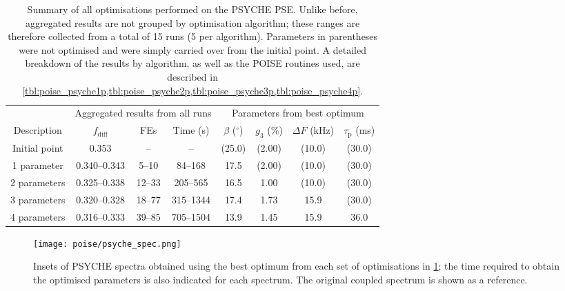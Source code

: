 \begin{table}
    \centering
    \begin{tabular}{cccccccc}
        \toprule
         & \multicolumn{3}{c}{Aggregated results from all runs} & \multicolumn{4}{c}{Parameters from best optimum} \\
        \cmidrule(lr){2-4} \cmidrule(lr){5-8}
        Description & $f_\mathrm{diff}$ & FEs              & Time (\unit{\s}) & $\beta$ ($^\circ$) & $g_3$ (\%) & $\Delta F$ (kHz) & $\tau_\mathrm{p}$ (ms) \\
        \midrule
        Initial point & 0.353        & --     & --        & (25.0) & (2.00) & (10.0) & (30.0) \\
        1 parameter   & 0.340--0.343 & 5--10  & 84--168   & 17.5   & (2.00) & (10.0) & (30.0) \\
        2 parameters  & 0.325--0.338 & 12--33 & 205--565  & 16.5   & 1.00   & (10.0) & (30.0) \\
        3 parameters  & 0.320--0.328 & 18--77 & 315--1344 & 17.4   & 1.73   & 15.9   & (30.0) \\
        4 parameters  & 0.316--0.333 & 39--85 & 705--1504 & 13.9   & 1.45   & 15.9   & 36.0   \\
        \bottomrule
    \end{tabular}
    \caption[Overview of all PSYCHE optimisations]{
        Summary of all optimisations performed on the PSYCHE PSE.
        Unlike before, aggregated results are not grouped by optimisation algorithm; these ranges are therefore collected from a total of 15 runs (5 per algorithm).
        Parameters in parentheses were not optimised and were simply carried over from the initial point.
        A detailed breakdown of the results by algorithm, as well as the POISE routines used, are described in \cref{tbl:poise_psyche1p,tbl:poise_psyche2p,tbl:poise_psyche3p,tbl:poise_psyche4p}.
    }
    \label{tbl:poise_psyche_summary}
\end{table}

\begin{figure}[htb]
    \centering
    \texttt{[image: poise/psyche\_spec.png]}%
    \caption[PSYCHE spectra before and after optimisation]{
        Insets of PSYCHE spectra obtained using the best optimum from each set of optimisations in \cref{tbl:poise_psyche_summary}; the time required to obtain the optimised parameters is also indicated for each spectrum.
        The original coupled \proton{} spectrum is shown as a reference.
    }
    \label{fig:poise_psyche_spec}
\end{figure}

